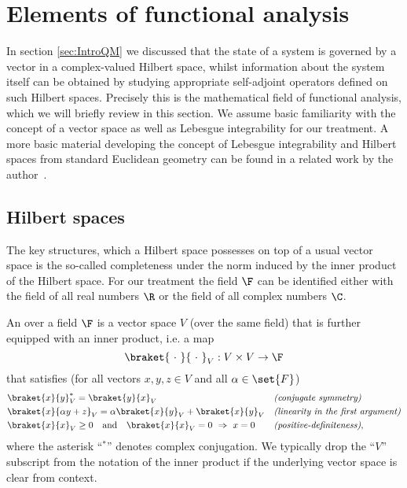 \section{Elements of functional analysis}

In section \vref{sec:IntroQM} we discussed that the state
of a \QM system is governed by a vector in a complex-valued Hilbert space,
whilst information about the system itself can be obtained by studying
appropriate self-adjoint operators defined on such Hilbert spaces.
Precisely this is the mathematical field of functional analysis,
which we will briefly review in this section.
We assume basic familiarity with the concept of a vector space as well
as Lebesgue integrability for our treatment.
A more basic material developing the concept of Lebesgue integrability
and Hilbert spaces from standard Euclidean geometry can be found
in a related work by the author~\cite{DiracNotation}.

\subsection{Hilbert spaces}
\label{sec:Hilbert}

The key structures,
which a Hilbert space possesses on top of a usual vector space
is the so-called completeness under the norm induced
by the inner product of the Hilbert space.
For our treatment the field $\F$ can be identified
either with the field of all real numbers $\R$
or the field of all complex numbers $\C$.

\begin{defn}
	An  over a field $\F$
	is a vector space $V$ (over the same field)
	that is further equipped with an inner product, i.e. a map
	\[ \braket{~\cdot~}{~\cdot~}_V : V \times V \to \F \]
	that satisfies (for all vectors $x,y,z \in V$ and all $\alpha \in \set{F}$)
	\begin{align}
		\label{eqn:innProdConjSym}
			&\braket{x}{y}_V^\ast = \braket{y}{x}_V &&
			\text{\textit{(conjugate symmetry)}} \\
		\label{eqn:innProdLinLeft}
			&\braket{x}{\alpha y + z}_V = \alpha \braket{x}{y}_V + \braket{x}{y}_V &&
			\text{\textit{(linearity in the first argument)}} \\
		\label{eqn:innProdPosDef}
			&\braket{x}{x}_V \ge 0 \quad \text{and}
			\quad \braket{x}{x}_V = 0 ~\Rightarrow~ x = 0  &&
			\text{\textit{(positive-definiteness)}},
	\end{align}
	where the asterisk ``$^\ast$'' denotes complex conjugation.
	We typically drop the ``$V$'' subscript from the notation of the inner
	product if the underlying vector space is clear from context.
\end{defn}

